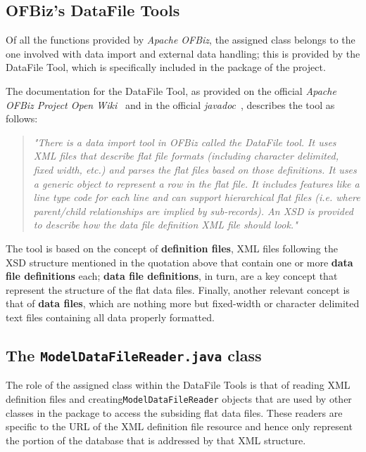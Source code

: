{\subsection{OFBiz's DataFile Tools}
Of all the functions provided by \textit{Apache OFBiz}, the assigned class belongs to the one involved with data import and external data handling; this is provided by the DataFile Tool, which is specifically included in the  package of the project.

The documentation for the DataFile Tool, as provided on the official \textit{Apache OFBiz Project Open Wiki}~\cite{apachewiki} and in the official \textit{javadoc}~\cite{ofbiz_jdoc}, describes the tool as follows:

\begin{quotation}
\textit{"There is a data import tool in OFBiz called the DataFile tool. It uses XML files that describe flat file formats (including character delimited, fixed width, etc.) and parses the flat files based on those definitions. It uses a generic object to represent a row in the flat file. It includes features like a line type code for each line and can support hierarchical flat files (i.e. where parent/child relationships are implied by sub-records). An XSD is provided to describe how the data file definition XML file should look."}
\end{quotation}

The tool is based on the concept of \textbf{definition files}, XML files following the XSD structure mentioned in the quotation above that contain one or more \textbf{data file definitions} each; \textbf{data file definitions}, in turn, are a key concept that represent the structure of the flat data files. Finally, another relevant concept is that of \textbf{data files}, which are nothing more but fixed-width or character delimited text files containing all data properly formatted.

\subsection{The \texttt{ModelDataFileReader.java} class}
The role of the assigned class within the DataFile Tools is that of reading XML definition files and creating\texttt{ModelDataFileReader} objects that are used by other classes in the package to access the subsiding flat data files. These readers are specific to the URL of the XML definition file resource and hence only represent the portion of the database that is addressed by that XML structure.

}
